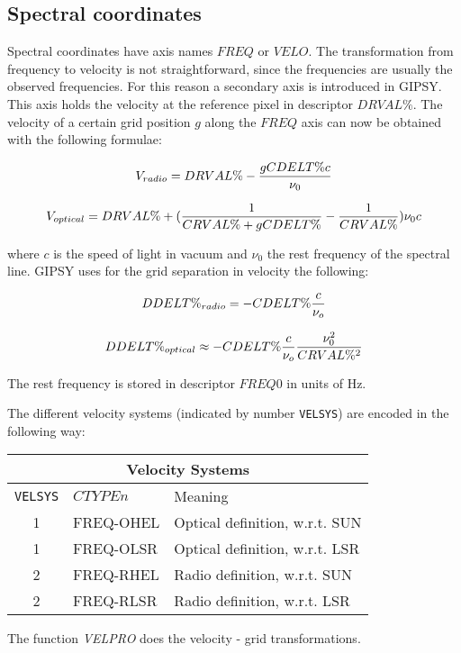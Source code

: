 \subsection{Spectral coordinates}

Spectral coordinates have axis names $FREQ$ or $VELO$.  The
transformation from frequency to velocity is not straightforward, since
the frequencies are usually the observed frequencies.  For this reason a
secondary axis is introduced in GIPSY.  This axis holds the velocity at
the reference pixel in descriptor $DRVAL\%$.  The velocity of a certain
grid position $g$ along the $FREQ$ axis can now be obtained with the
following formulae:

$$V_{radio} = DRVAL\%-{gCDELT\%c\over{\nu_0}}$$

$$V_{optical} = DRVAL\%+({1\over{CRVAL\%+gCDELT\%}}-{1\over{CRVAL\%}})\nu_0c$$

\noindent where $c$ is the speed of light in vacuum and $\nu_0$ the rest
frequency of the spectral line. GIPSY uses for the grid separation in
velocity the following:

$$DDELT\%_{radio} = - CDELT\%{c\over{\nu_o}}$$

$$DDELT\%_{optical} \approx - CDELT\%{c\over{\nu_o}}{\nu_0^2\over{CRVAL\%^2}}$$

\noindent The rest frequency is stored in descriptor $FREQ0$ in units of
Hz.

The different velocity systems (indicated by number {\tt VELSYS}) are
encoded in the following way:

\begin{center}
\begin{tabular}{|c|l|l|}
\hline
\multicolumn{3}{|c|}{Velocity Systems}\\
\hline
{\tt VELSYS}&$CTYPEn$&Meaning\\
\hline
1&FREQ-OHEL&Optical definition, w.r.t. SUN\\
1&FREQ-OLSR&Optical definition, w.r.t. LSR\\
2&FREQ-RHEL&Radio definition, w.r.t. SUN\\
2&FREQ-RLSR&Radio definition, w.r.t. LSR\\
\hline
\end{tabular}
\end{center}

\noindent The function {\sl VELPRO\/} does the
velocity - grid transformations.

